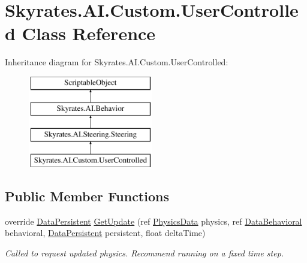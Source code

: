 \hypertarget{class_skyrates_1_1_a_i_1_1_custom_1_1_user_controlled}{\section{Skyrates.\-A\-I.\-Custom.\-User\-Controlled Class Reference}
\label{class_skyrates_1_1_a_i_1_1_custom_1_1_user_controlled}
}
Inheritance diagram for Skyrates.\-A\-I.\-Custom.\-User\-Controlled\-:\begin{figure}[H]
\begin{center}
\leavevmode
\includegraphics[height=4.000000cm]{class_skyrates_1_1_a_i_1_1_custom_1_1_user_controlled}
\end{center}
\end{figure}
\subsection*{Public Member Functions}
\begin{DoxyCompactItemize}
\item 
override \hyperlink{class_skyrates_1_1_a_i_1_1_behavior_1_1_data_persistent}{Data\-Persistent} \hyperlink{class_skyrates_1_1_a_i_1_1_custom_1_1_user_controlled_afd0f1fae5c1763a8de66b362fb825a9c}{Get\-Update} (ref \hyperlink{class_skyrates_1_1_physics_1_1_physics_data}{Physics\-Data} physics, ref \hyperlink{class_skyrates_1_1_a_i_1_1_behavior_1_1_data_behavioral}{Data\-Behavioral} behavioral, \hyperlink{class_skyrates_1_1_a_i_1_1_behavior_1_1_data_persistent}{Data\-Persistent} persistent, float delta\-Time)
\begin{DoxyCompactList}\small\item\em Called to request updated physics. Recommend running on a fixed time step. \end{DoxyCompactList}\end{DoxyCompactItemize}
